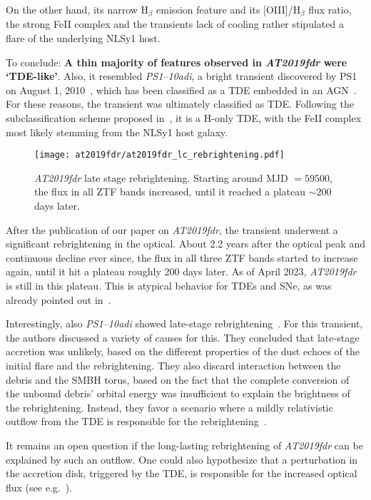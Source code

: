 On the other hand, its narrow H$_\beta$ emission feature and its [OIII]/H$_\beta$ flux ratio, the strong FeII complex and the transients lack of cooling rather stipulated a flare of the underlying NLSy1 host.

To conclude: \textbf{A thin majority of features observed in \emph{AT2019fdr} were `TDE-like'}. Also, it resembled \emph{PS1--10adi}, a bright transient discovered by PS1 on August 1, 2010~, which has been classified as a TDE embedded in an AGN~. For these reasons, the transient was ultimately classified as TDE. Following the subclassification scheme proposed in~, it is a H-only TDE, with the FeII complex most likely stemming from the NLSy1 host galaxy.

\begin{figure}[htb]
    \texttt{[image: at2019fdr/at2019fdr\_lc\_rebrightening.pdf]}
    \caption[\emph{AT2019fdr} rebrightening]{\emph{AT2019fdr} late stage rebrightening. Starting around MJD $=59500$, the flux in all ZTF bands increased, until it reached a plateau $\sim 200$ days later.}
\end{figure}

After the publication of our paper on \emph{AT2019fdr}, the transient underwent a significant rebrightening in the optical. About 2.2 years after the optical peak and continuous decline ever since, the flux in all three ZTF bands started to increase again, until it hit a plateau roughly 200 days later. As of April 2023, \emph{AT2019fdr} is still in this plateau. This is atypical behavior for TDEs and SNe, as was already pointed out in~\cite{Frederick2021}.

Interestingly, also \emph{PS1--10adi} showed late-stage rebrightening~\cite{Jiang2019}. For this transient, the authors discussed a variety of causes for this. They concluded that late-stage accretion was unlikely, based on the different properties of the dust echoes of the initial flare and the rebrightening. They also discard interaction between the debris and the SMBH torus, based on the fact that the complete conversion of the unbound debris' orbital energy was insufficient to explain the brightness of the rebrightening. Instead, they favor a scenario where a mildly relativistic outflow from the TDE is responsible for the rebrightening~\cite{Jiang2019}.

It remains an open question if the long-lasting rebrightening of \emph{AT2019fdr} can be explained by such an outflow. One could also hypothesize that a perturbation in the accretion disk, triggered by the TDE, is responsible for the increased optical flux (see e.g.~).

